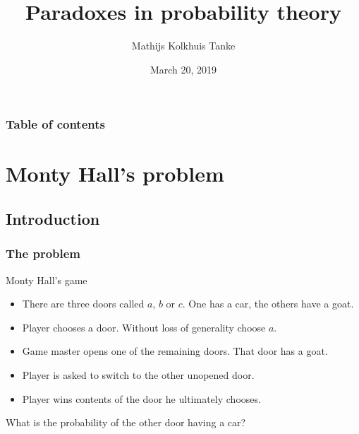 \documentclass{beamer}
\title{Paradoxes in probability theory}
\author{Mathijs Kolkhuis Tanke}
\institute{De Leidsche Flesch}
\date{March 20, 2019}
\theoremstyle{plain}
\theoremstyle{definition}
\theoremstyle{remark}
\newcommand{\1}{\mathbbm{1}}
\begin{document}
\begin{frame}
	\titlepage
\end{frame}

\begin{frame} %
	\frametitle{Table of contents} %
	\tableofcontents 
\end{frame}

\section{Monty Hall's problem}
\subsection*{Introduction}
\begin{frame}
\frametitle{The problem}
\begin{exampleblock}{Monty Hall's game}
\begin{itemize}
\item There are three doors called $a$, $b$ or $c$. One has a car, the others have a goat.
\item Player chooses a door. Without loss of generality choose $a$.
\item Game master opens one of the remaining doors. That door has a goat.
\item Player is asked to switch to the other unopened door.
\item Player wins contents of the door he ultimately chooses.
\end{itemize}
\end{exampleblock}

What is the probability of the other door having a car?
\end{frame}
\end{document}

